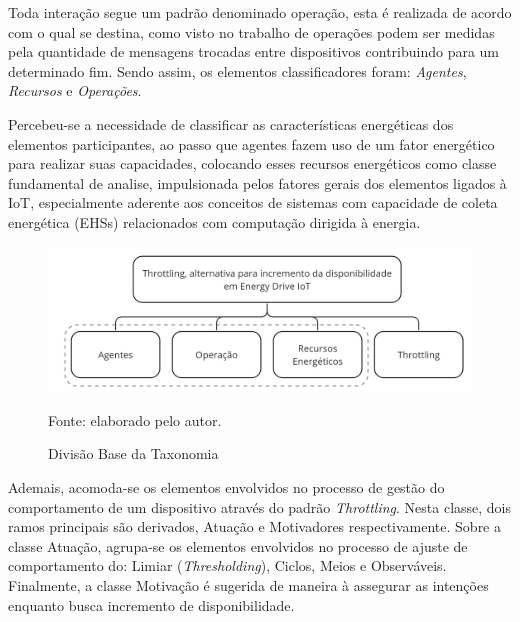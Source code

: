 Toda interação segue um padrão denominado operação, esta é realizada de acordo com o qual se destina, como visto no trabalho de \cite{khairnar_discrete-rate_2015} operações podem ser medidas pela quantidade de mensagens trocadas entre dispositivos contribuindo para um determinado fim. Sendo assim, os elementos classificadores foram: \textit{Agentes}, \textit{Recursos} e \textit{Operações}.

Percebeu-se a necessidade de classificar as características energéticas dos elementos participantes, ao passo que agentes fazem uso de um fator energético para realizar suas capacidades, colocando esses recursos energéticos como classe fundamental de analise, impulsionada pelos fatores gerais dos elementos ligados à \acs{IoT}, especialmente aderente aos conceitos de sistemas com  capacidade de coleta energética (\aclp{EHS}) relacionados com computação dirigida à energia.


\begin{figure}[hbt]
	\centering
	\caption{Divisão Base da Taxonomia}
	\label{fig:cap4divisaobasetaxonomia}
	\includegraphics[width=0.7\linewidth]{Imagens/cap4/cap4taxonomia_primeironivel.jpg}	
	
	Fonte: elaborado pelo autor.
\end{figure}

Ademais, acomoda-se os elementos envolvidos no processo de gestão do comportamento de um dispositivo através do padrão \textit{Throttling}. Nesta classe, dois ramos principais são derivados, Atuação e Motivadores respectivamente. Sobre a classe Atuação, agrupa-se os elementos envolvidos no processo de ajuste de comportamento do: Limiar (\textit{Thresholding}), Ciclos, Meios e Observáveis. Finalmente, a classe Motivação é sugerida de maneira à assegurar as intenções enquanto busca incremento de disponibilidade. 

